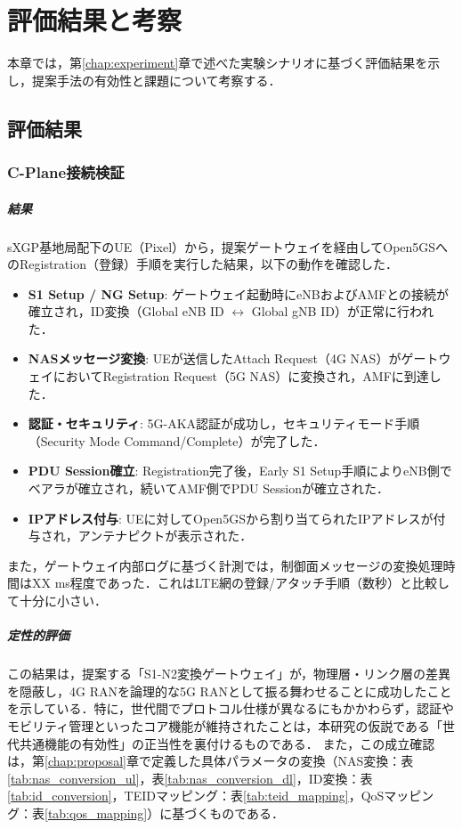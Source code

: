 \chapter{評価結果と考察}
\label{chap:evaluation}

本章では，第\ref{chap:experiment}章で述べた実験シナリオに基づく評価結果を示し，提案手法の有効性と課題について考察する．

\section{評価結果}

\subsection{C-Plane接続検証}
\paragraph{結果}
sXGP基地局配下のUE（Pixel）から，提案ゲートウェイを経由してOpen5GSへのRegistration（登録）手順を実行した結果，以下の動作を確認した．

\begin{itemize}
    \item \textbf{S1 Setup / NG Setup}: ゲートウェイ起動時にeNBおよびAMFとの接続が確立され，ID変換（Global eNB ID $\leftrightarrow$ Global gNB ID）が正常に行われた．
    \item \textbf{NASメッセージ変換}: UEが送信したAttach Request（4G NAS）がゲートウェイにおいてRegistration Request（5G NAS）に変換され，AMFに到達した．
    \item \textbf{認証・セキュリティ}: 5G-AKA認証が成功し，セキュリティモード手順（Security Mode Command/Complete）が完了した．
    \item \textbf{PDU Session確立}: Registration完了後，Early S1 Setup手順によりeNB側でベアラが確立され，続いてAMF側でPDU Sessionが確立された．
    \item \textbf{IPアドレス付与}: UEに対してOpen5GSから割り当てられたIPアドレスが付与され，アンテナピクトが表示された．
\end{itemize}

また，ゲートウェイ内部ログに基づく計測では，制御面メッセージの変換処理時間はXX ms程度であった．これはLTE網の登録/アタッチ手順（数秒）と比較して十分に小さい．

\paragraph{定性的評価}
この結果は，提案する「S1-N2変換ゲートウェイ」が，物理層・リンク層の差異を隠蔽し，4G RANを論理的な5G RANとして振る舞わせることに成功したことを示している．特に，世代間でプロトコル仕様が異なるにもかかわらず，認証やモビリティ管理といったコア機能が維持されたことは，本研究の仮説である「世代共通機能の有効性」の正当性を裏付けるものである．
また，この成立確認は，第\ref{chap:proposal}章で定義した具体パラメータの変換（NAS変換：表\ref{tab:nas_conversion_ul}，表\ref{tab:nas_conversion_dl}，ID変換：表\ref{tab:id_conversion}，TEIDマッピング：表\ref{tab:teid_mapping}，QoSマッピング：表\ref{tab:qos_mapping}）に基づくものである．

